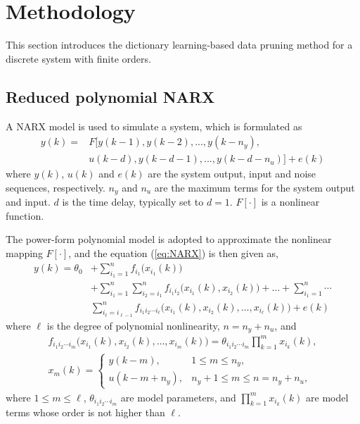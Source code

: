\documentclass{article}
\begin{document}
\section{Methodology}
This section introduces the dictionary learning-based data pruning method for a discrete system with finite orders. 

\subsection{Reduced polynomial NARX}
A NARX model is used to simulate a system, which is formulated as
\begin{equation}\label{eq:NARX}
\begin{split}
y(k) = & F[y(k-1),y(k-2),..., y(k-n_y),\\
       & u(k-d),y(k-d-1),..., y(k-d-n_u)]+e(k)
\end{split}
\end{equation}
where $y(k)$, $u(k)$ and $e(k)$ are the system output, input and noise sequences, respectively. $n_y$ and $n_u$ are the maximum terms for the system output and input. $d$ is the time delay, typically set to $d = 1$.
$F[\cdot]$ is a nonlinear function. 

The power-form polynomial model is adopted to approximate the nonlinear mapping $F[\cdot]$, and the equation (\ref{eq:NARX}) is then given as,
\begin{equation}\label{eq:NARX_Poly}
\begin{split}
y(k) = \theta_0 
&+ \sum_{i_1=1}^{n} f_{i_1}\big(x_{i_1}(k)\big) \\
&+ \sum_{i_1=1}^{n} \sum_{i_2=i_1}^{n} f_{i_1 i_2}\big(x_{i_1}(k), x_{i_2}(k)\big) 
+ \dots + \sum_{i_1=1}^{n} \cdots \\
&\sum_{i_\ell=i_{\ell-1}}^{n} f_{i_1 i_2 \cdots i_\ell}\big(x_{i_1}(k), x_{i_2}(k), \dots, x_{i_\ell}(k)\big) 
+ e(k)
\end{split}
\end{equation}
where $\ell$ is the degree of polynomial nonlinearity, $n = n_y+n_u$, and 
\begin{align*}
f_{i_1 i_2 \cdots i_m}\big(x_{i_1}(k), x_{i_2}(k), \dots, x_{i_m}(k)\big) 
= \theta_{i_1 i_2 \cdots i_m} \prod_{k=1}^{m} x_{i_k}(k), \\
x_m(k) =
\begin{cases} 
y(k-m), & 1 \leq m \leq n_y, \\
u(k-m+n_y), & n_y+1 \leq m \leq n = n_y + n_u,
\end{cases}
\end{align*}
where $ 1 \leq m \leq \ell $, $\theta_{i_1 i_2 \cdots i_m}$ are model parameters, and $\prod_{k=1}^{m} x_{i_k}(k)$ are model terms whose order is not higher than $\ell$.
\end{document}
